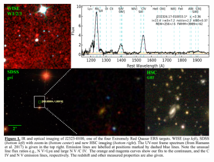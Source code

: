 \hspace{-7.5cm}
\begin{figure}[h]
  \begin{center}
    \hspace{-0.5cm}
    \includegraphics[height=12.0cm,width=16.0cm]{../Figures/WISE_SDSSzoomHSC_ERQ-image_v2.pdf}
    \vspace{-10pt}
    \vspace{-14pt}
    \label{figtest-fig}
  \end{center}
\end{figure}

